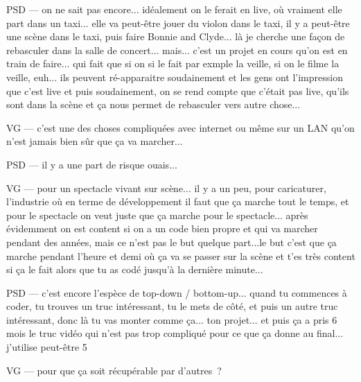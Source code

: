 PSD — on ne sait pas encore... idéalement on le ferait en live, où vraiment elle part dans un taxi... elle va peut-être jouer du violon dans le taxi, il y a peut-être une scène dans le taxi, puis faire Bonnie and Clyde... là je cherche une façon de rebasculer dans la salle de concert... mais... c'est un projet en cours qu'on est en train de faire... qui fait que si on si le fait par exmple la veille, si on le filme la veille, euh... ils peuvent ré-apparaitre soudainement et les gens ont l'impression que c'est live et puis soudainement, on se rend compte que c'était pas live, qu'ils sont dans la scène et ça nous permet de rebasculer vers autre chose...

VG — c'est une des choses compliquées avec internet ou même sur un LAN qu'on n'est jamais bien sûr que ça va marcher...

PSD — il y a une part de risque ouais... 

VG —  pour un spectacle vivant sur scène... il y a un peu, pour caricaturer, l'industrie où en terme de développement il faut que ça marche tout le temps, et pour le spectacle on veut juste que ça marche pour le spectacle... après évidemment on est content si on a un code bien propre et qui va marcher pendant des années, mais ce n'est pas le but quelque part...le but c'est que ça marche pendant l'heure et demi où ça va se passer sur la scène et t'es très content si ça le fait alors que tu as codé jusqu'à la dernière minute...

PSD — c'est encore l'espèce de top-down / bottom-up... quand tu commences à coder, tu trouves un truc intéressant, tu le mets de côté, et puis un autre truc intéressant, donc là tu vas monter comme ça... ton projet... et puis ça a pris 6 mois le truc vidéo qui n'est pas trop compliqué pour ce que ça donne au final... j'utilise peut-être 5 %

VG — pour que ça soit récupérable par d'autres ?


